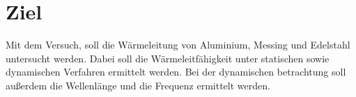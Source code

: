 \section{Ziel}
\label{sec:ziel}
Mit dem Versuch, soll die Wärmeleitung von Aluminium, Messing und Edelstahl untersucht werden.
Dabei soll die Wärmeleitfähigkeit unter statischen sowie dynamischen Verfahren ermittelt werden. Bei der dynamischen betrachtung soll außerdem
die Wellenlänge und die Frequenz ermittelt werden.